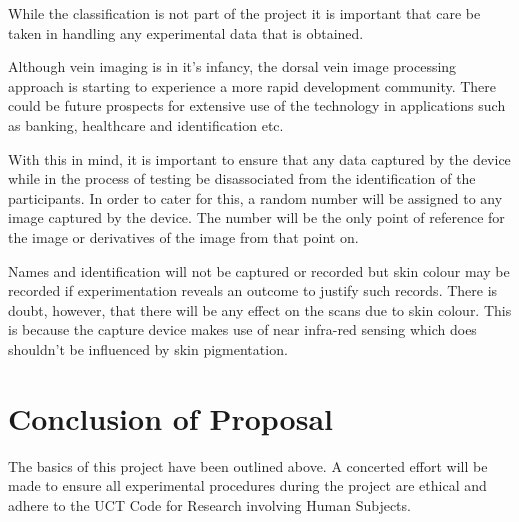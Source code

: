 \documentclass[10pt,a4paper,twoside,noindent]{report}
\begin{document}
While the classification is not part of the project it is important that care be taken in handling any experimental data that is obtained.

Although vein imaging is in it's infancy, the dorsal vein image processing approach is starting to experience a more rapid development community. There could be future prospects for extensive use of the technology in applications such as banking, healthcare and identification etc.

With this in mind, it is important to ensure that any data captured by the device while in the process of testing be disassociated from the identification of the participants. In order to cater for this, a random number will be assigned to any image captured by the device. The number will be the only point of reference for the image or derivatives of the image from that point on.

Names and identification will not be captured or recorded but skin colour may be recorded if experimentation reveals an outcome to justify such records. There is doubt, however, that there will be any effect on the scans due to skin colour. This is because the capture device makes use of near infra-red sensing which does shouldn't be influenced by skin pigmentation.

\section*{Conclusion of Proposal}
The basics of this project have been outlined above. A concerted effort will be made to ensure all experimental procedures during the project are ethical and adhere to the UCT Code for Research involving Human Subjects.
\end{document}
